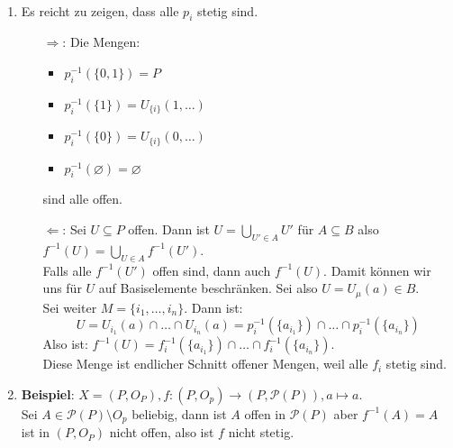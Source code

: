\begin{solution}
  \
  \begin{enumerate}[label= (\alph*)]
    \item Es reicht zu zeigen, dass alle \( p_i \) stetig sind.
    \begin{itemize}
      \item[\( \Rightarrow \):] Die Mengen:
      \begin{itemize}
        \item \( p_i^{-1}(\{ 0,1 \}) = P \) 
        \item \( p_i^{-1}(\{ 1 \}) = U_{\{ i \}}(1,\dots) \) 
        \item \( p_i^{-1}(\{ 0 \}) = U_{\{ i \}}(0,\dots) \) 
        \item \( p_i^{-1}(\varnothing) = \varnothing \) 
      \end{itemize}
      sind alle offen.
      
      \item[\( \Leftarrow \):] Sei \( U \subseteq P \) offen. Dann ist \( U = \bigcup_{U' \in A}U' \) für \( A \subseteq B \) also \( f^{-1}(U) = \bigcup_{U \in A} f^{-1}(U') \). \\
      Falls alle \( f^{-1}(U') \) offen sind, dann auch \( f^{-1}(U) \). Damit können wir uns für \( U \) auf Basiselemente beschränken. Sei also \( U = U_\mu(a) \in B \). \\
      Sei weiter \( M = \{ i_1, \dots,i_n \} \). Dann ist:
      \begin{equation*}
        U = U_{i_1}(a)\cap \dots \cap U_{i_n}(a) = p_i^{-1}(\{ a_{i_1} \}) \cap \dots \cap p_i^{-1}(\{ a_{i_n} \})
      \end{equation*}
      Also ist: \( f^{-1}(U) = f_i^{-1}(\{ a_{i_1} \}) \cap \dots \cap f_i^{-1}(\{ a_{i_n} \}) \). \\
      Diese Menge ist endlicher Schnitt offener Mengen, weil alle \( f_i \) stetig sind.
    \end{itemize}
    
    \item \textbf{Beispiel}: \( X = (P, O_P), f: (P, O_p) \to (P, \mathcal{P}(P)), a \mapsto a \). \\
    Sei \( A \in \mathcal{P}(P) \setminus O_p \) beliebig, dann ist \( A \) offen in \( \mathcal{P}(P) \) aber 
    \( f^{-1}(A) = A \) ist in \( (P, O_P) \) nicht offen, also ist \( f \) nicht stetig.
  \end{enumerate}
\end{solution}



